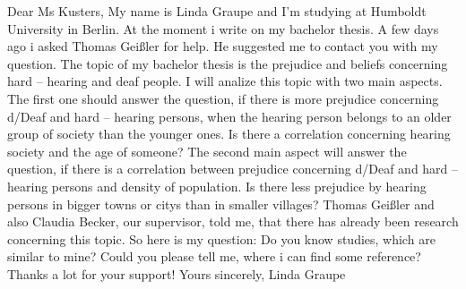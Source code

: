 Dear Ms Kusters,
My name is Linda Graupe and I'm studying at Humboldt University in Berlin. At the moment i write on my bachelor thesis. A few days ago i asked Thomas Geißler for help. He suggested me to contact you with my question. The topic of my bachelor thesis is the prejudice and beliefs concerning hard – hearing and deaf people. I will analize this topic with two main aspects. The first one should answer the question, if there is more prejudice concerning d/Deaf and hard – hearing persons, when the hearing person belongs to an older group of society than the younger ones. Is there a correlation concerning hearing society and the age of someone? The second main aspect will answer the question, if there is a correlation between  prejudice concerning d/Deaf and hard – hearing persons and density of population. Is there less prejudice by hearing persons in bigger towns or citys than in smaller villages?
Thomas Geißler and also Claudia Becker, our supervisor, told me, that there has already been research concerning this topic. So here is my question: Do you know studies, which are similar to mine? Could you please tell me, where i can find some reference?
Thanks a lot for your support!
Yours sincerely,
Linda Graupe
